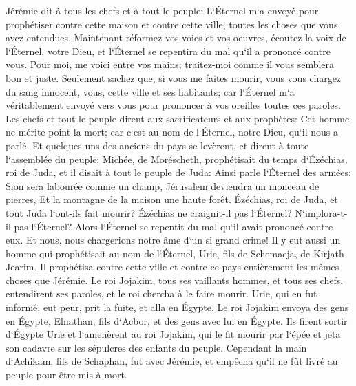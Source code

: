 \verse Jérémie dit à tous les chefs et à tout le peuple: L`Éternel m`a envoyé pour prophétiser contre cette maison et contre cette ville, toutes les choses que vous avez entendues. 
\verse Maintenant réformez vos voies et vos oeuvres, écoutez la voix de l`Éternel, votre Dieu, et l`Éternel se repentira du mal qu`il a prononcé contre vous. 
\verse Pour moi, me voici entre vos mains; traitez-moi comme il vous semblera bon et juste. 
\verse Seulement sachez que, si vous me faites mourir, vous vous chargez du sang innocent, vous, cette ville et ses habitants; car l`Éternel m`a véritablement envoyé vers vous pour prononcer à vos oreilles toutes ces paroles. 
\verse Les chefs et tout le peuple dirent aux sacrificateurs et aux prophètes: Cet homme ne mérite point la mort; car c`est au nom de l`Éternel, notre Dieu, qu`il nous a parlé. 
\verse Et quelques-uns des anciens du pays se levèrent, et dirent à toute l`assemblée du peuple: 
\verse Michée, de Moréscheth, prophétisait du temps d`Ézéchias, roi de Juda, et il disait à tout le peuple de Juda: Ainsi parle l`Éternel des armées: Sion sera labourée comme un champ, Jérusalem deviendra un monceau de pierres, Et la montagne de la maison une haute forêt. 
\verse Ézéchias, roi de Juda, et tout Juda l`ont-ils fait mourir? Ézéchias ne craignit-il pas l`Éternel? N`implora-t-il pas l`Éternel? Alors l`Éternel se repentit du mal qu`il avait prononcé contre eux. Et nous, nous chargerions notre âme d`un si grand crime! 
\verse Il y eut aussi un homme qui prophétisait au nom de l`Éternel, Urie, fils de Schemaeja, de Kirjath Jearim. Il prophétisa contre cette ville et contre ce pays entièrement les mêmes choses que Jérémie. 
\verse Le roi Jojakim, tous ses vaillants hommes, et tous ses chefs, entendirent ses paroles, et le roi chercha à le faire mourir. Urie, qui en fut informé, eut peur, prit la fuite, et alla en Égypte. 
\verse Le roi Jojakim envoya des gens en Égypte, Elnathan, fils d`Acbor, et des gens avec lui en Égypte. 
\verse Ils firent sortir d`Égypte Urie et l`amenèrent au roi Jojakim, qui le fit mourir par l`épée et jeta son cadavre sur les sépulcres des enfants du peuple. 
\verse Cependant la main d`Achikam, fils de Schaphan, fut avec Jérémie, et empêcha qu`il ne fût livré au peuple pour être mis à mort. 

